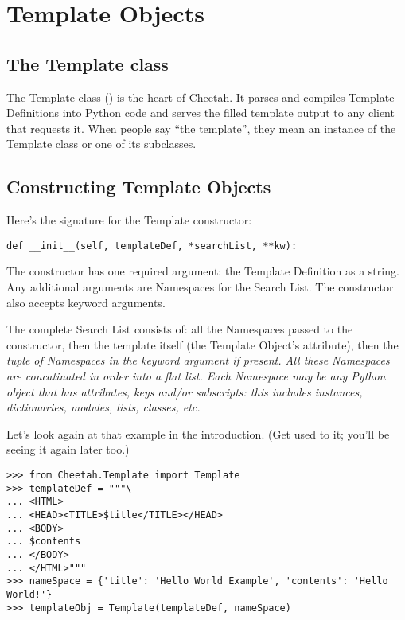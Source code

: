 \section{Template Objects}
\label{TSobjects}

\subsection{The Template class}

The Template class () is the heart of Cheetah.
It parses and compiles Template Definitions into Python code and serves the
filled template output to any client that requests it.  When people say ``the
template'', they mean an instance of the Template class or one of its
subclasses.


\subsection{Constructing Template Objects}

Here's the signature for the Template constructor:

\begin{verbatim}
def __init__(self, templateDef, *searchList, **kw):
\end{verbatim}

The constructor has one required argument: the Template Definition as
a string.  Any additional arguments are Namespaces for the Search List.  The
constructor also accepts keyword arguments.

The complete Search List consists of:  all the Namespaces passed to the
constructor, then the template itself (the Template Object's 
attribute), then the \em{tuple} of Namespaces in the keyword argument
 if present.  All these Namespaces are concatinated in order
into a flat list.  Each Namespace may be any Python object that has attributes,
keys and/or subscripts: this includes instances, dictionaries, modules,
lists, classes, etc.

Let's look again at that example in the introduction.  (Get used to it; you'll
be seeing it again later too.)

\begin{verbatim}
>>> from Cheetah.Template import Template
>>> templateDef = """\
... <HTML>
... <HEAD><TITLE>$title</TITLE></HEAD>
... <BODY>
... $contents
... </BODY>
... </HTML>"""
>>> nameSpace = {'title': 'Hello World Example', 'contents': 'Hello World!'}
>>> templateObj = Template(templateDef, nameSpace)
\end{verbatim}

